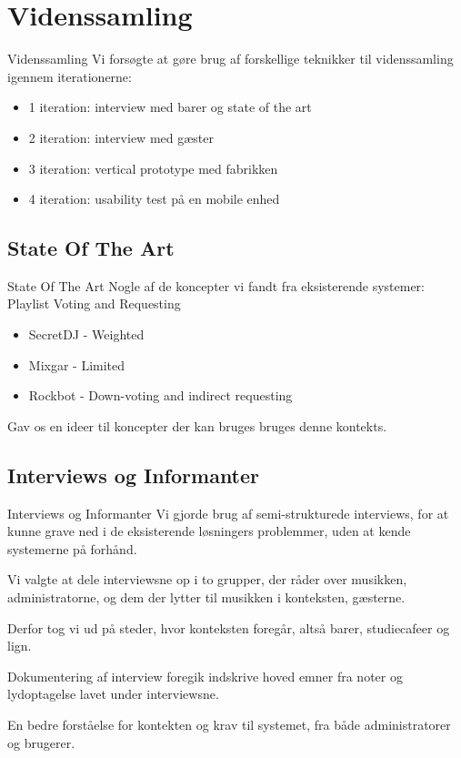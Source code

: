 \section{Videnssamling}
\begin{frame}{Videnssamling}
Vi forsøgte at gøre brug af forskellige teknikker til videnssamling igennem iterationerne:
\begin{itemize}
\item 1 iteration: interview med barer og state of the art
\item 2 iteration: interview med gæster
\item 3 iteration: vertical prototype med fabrikken
\item 4 iteration: usability test på en mobile enhed
\end{itemize}
\end{frame}

\subsection{State Of The Art}
\begin{frame}{State Of The Art}
	Nogle af de koncepter vi fandt fra eksisterende systemer:
	Playlist
	Voting and Requesting
	\begin{itemize}
	\item SecretDJ - Weighted
	\item Mixgar - Limited
	\item Rockbot - Down-voting and indirect requesting
	\end{itemize}

	Gav os en ideer til koncepter der kan bruges bruges denne kontekts.
\end{frame}
\subsection{Interviews og Informanter}
\begin{frame}{Interviews og Informanter}
	Vi gjorde brug af semi-strukturede interviews, for at kunne grave ned i de eksisterende løsningers problemmer, uden at kende systemerne på forhånd.

	Vi valgte at dele interviewsne op i to grupper, der råder over musikken, administratorne, og dem der lytter til musikken i konteksten, gæsterne.

	Derfor tog vi ud på steder, hvor konteksten foregår, altså barer, studiecafeer og lign.

	Dokumentering af interview foregik indskrive hoved emner fra noter og lydoptagelse lavet under interviewsne.

	En bedre forståelse for kontekten og krav til systemet, fra både administratorer og brugerer.
\end{frame}

